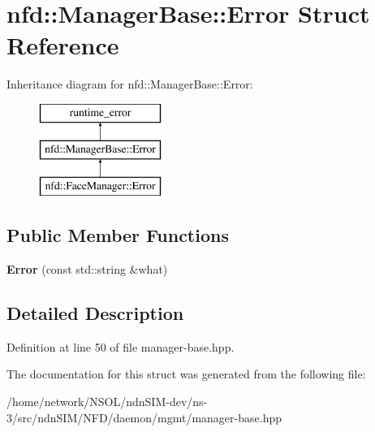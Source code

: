 \hypertarget{structnfd_1_1ManagerBase_1_1Error}{}\section{nfd\+:\+:Manager\+Base\+:\+:Error Struct Reference}
\label{structnfd_1_1ManagerBase_1_1Error}
Inheritance diagram for nfd\+:\+:Manager\+Base\+:\+:Error\+:\begin{figure}[H]
\begin{center}
\leavevmode
\includegraphics[height=3.000000cm]{structnfd_1_1ManagerBase_1_1Error}
\end{center}
\end{figure}
\subsection*{Public Member Functions}
\begin{DoxyCompactItemize}
\item 
{\bfseries Error} (const std\+::string \&what)\hypertarget{structnfd_1_1ManagerBase_1_1Error_a91c1a4133b9f864881a6c7d9197355c8}{}\label{structnfd_1_1ManagerBase_1_1Error_a91c1a4133b9f864881a6c7d9197355c8}

\end{DoxyCompactItemize}


\subsection{Detailed Description}


Definition at line 50 of file manager-\/base.\+hpp.



The documentation for this struct was generated from the following file\+:\begin{DoxyCompactItemize}
\item 
/home/network/\+N\+S\+O\+L/ndn\+S\+I\+M-\/dev/ns-\/3/src/ndn\+S\+I\+M/\+N\+F\+D/daemon/mgmt/manager-\/base.\+hpp\end{DoxyCompactItemize}
